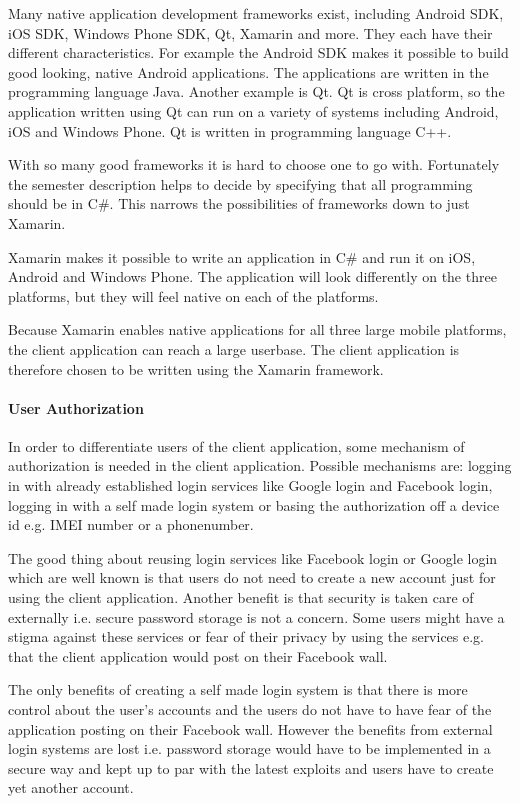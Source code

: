 Many native application development frameworks exist, including Android SDK, iOS SDK, Windows Phone SDK, Qt, Xamarin and more. They each have their different characteristics. For example the Android SDK makes it possible to build good looking, native Android applications. The applications are written in the programming language Java. Another example is Qt. Qt is cross platform, so the application written using Qt can run on a variety of systems including Android, iOS and Windows Phone. Qt is written in programming language C++.

With so many good frameworks it is hard to choose one to go with. Fortunately the semester description helps to decide by specifying that all programming should be in C\#. This narrows the possibilities of frameworks down to just Xamarin.

Xamarin makes it possible to write an application in C\# and run it on iOS, Android and Windows Phone. The application will look differently on the three platforms, but they will feel native on each of the platforms.

Because Xamarin enables native applications for all three large mobile platforms, the client application can reach a large userbase. The client application is therefore chosen to be written using the Xamarin framework.

\paragraph{User Authorization}
\label{par:user_authorization}

In order to differentiate users of the client application, some mechanism of authorization is needed in the client application. Possible mechanisms are: logging in with already established login services like Google login and Facebook login, logging in with a self made login system or basing the authorization off a device id e.g. IMEI number or a phonenumber.

The good thing about reusing login services like Facebook login or Google login which are well known is that users do not need to create a new account just for using the client application. Another benefit is that security is taken care of externally i.e. secure password storage is not a concern. Some users might have a stigma against these services or fear of their privacy by using the services e.g. that the client application would post on their Facebook wall.

The only benefits of creating a self made login system is that there is more control about the user's accounts and the users do not have to have fear of the application posting on their Facebook wall. However the benefits from external login systems are lost i.e. password storage would have to be implemented in a secure way and kept up to par with the latest exploits and users have to create yet another account.

